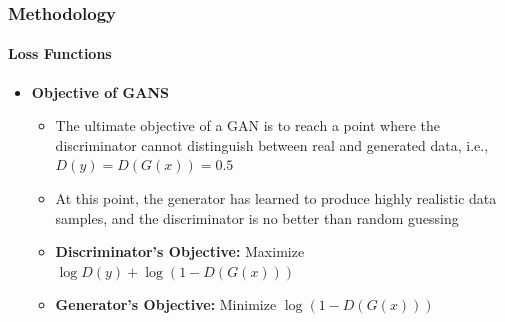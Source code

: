 \documentclass[aspectratio=169, lecture, amberg]{OTHAWbeamer}
\begin{document}
\begin{frame}[t]
    \frametitle{Methodology}
    \framesubtitle{Loss Functions}
    \begin{itemize}
        \item \textbf{Objective of GANS}
        \vspace{0.4cm}
        \begin{itemize}
            \item The ultimate objective of a GAN is to reach a point where the discriminator cannot distinguish between real and generated data, i.e., \(D(y) = D(G(x)) = 0.5\)
            \vspace{0.4cm}
            \item At this point, the generator has learned to produce highly realistic data samples, and the discriminator is no better than random guessing
            \vspace{0.4cm}
            \item \textbf{Discriminator's Objective:} Maximize \(\log D(y) + \log (1 - D(G(x)))\)
            \vspace{0.4cm}
            \item \textbf{Generator's Objective:} Minimize \(\log (1 - D(G(x)))\)

        \end{itemize}
    \end{itemize}
    
\end{frame}
\end{document}
